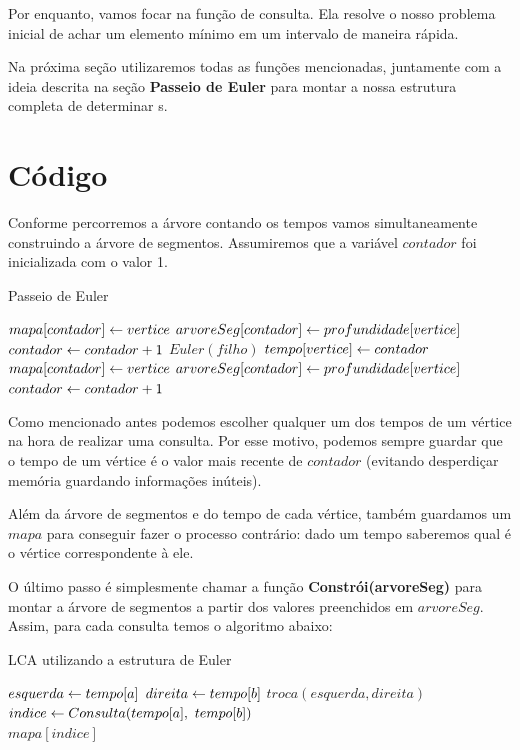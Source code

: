 Por enquanto, vamos focar na função de consulta. Ela resolve o nosso problema inicial de achar um elemento mínimo em um intervalo de maneira rápida.

Na próxima seção utilizaremos todas as funções mencionadas, juntamente com a ideia descrita na seção \textbf{Passeio de Euler} para montar a nossa estrutura completa de determinar \LCA s.

\section{Código}

Conforme percorremos a árvore contando os tempos vamos simultaneamente construindo a árvore de segmentos. Assumiremos que a variável $contador$ foi inicializada com o valor 1.

\begin{algorithm}[H]
\caption{Passeio de Euler}
\begin{algorithmic}[1]
        \State $mapa[contador] \leftarrow vertice$
        \State $arvoreSeg[contador] \leftarrow profundidade[vertice]$
        \State $contador \leftarrow contador + 1$
        \State $Euler(filho)$
    \EndFor
    \State $tempo[vertice] \leftarrow contador$
    \State $mapa[contador] \leftarrow vertice$
    \State $arvoreSeg[contador] \leftarrow profundidade[vertice]$
    \State $contador \leftarrow contador + 1$
\EndFunction
\end{algorithmic}
\end{algorithm}

Como mencionado antes podemos escolher qualquer um dos tempos de um vértice na hora de realizar uma consulta. Por esse motivo, podemos sempre guardar que o tempo de um vértice é o valor mais recente de $contador$ (evitando desperdiçar memória guardando informações inúteis).

Além da árvore de segmentos e do tempo de cada vértice, também guardamos um $mapa$ para conseguir fazer o processo contrário: dado um tempo saberemos qual é o vértice correspondente à ele.

O último passo é simplesmente chamar a função \textbf{Constrói(arvoreSeg)} para montar a árvore de segmentos a partir dos valores preenchidos em $arvoreSeg$. Assim, para cada consulta temos o algoritmo abaixo:

\begin{algorithm}[H]
\caption{LCA utilizando a estrutura de Euler}
\begin{algorithmic}[1]
    \State $esquerda \leftarrow tempo[a]$
    \State $direita \leftarrow tempo[b]$
        \State $troca(esquerda, direita)$
    \EndIf
    \State $indice \rec Consulta(tempo[a],\ tempo[b])$
    \\\hspace{5mm} \Return $mapa[indice]$
\EndFunction
\end{algorithmic}
\end{algorithm}

